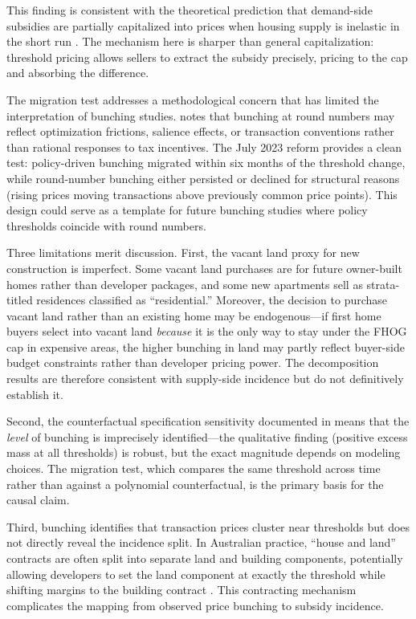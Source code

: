 \documentclass[12pt]{article}
\begin{document}
This finding is consistent with the theoretical prediction that demand-side subsidies are partially capitalized into prices when housing supply is inelastic in the short run \citep{susin2002rent, hilber2016impact}. The mechanism here is sharper than general capitalization: threshold pricing allows sellers to extract the subsidy precisely, pricing to the cap and absorbing the difference.

The migration test addresses a methodological concern that has limited the interpretation of bunching studies. \citet{kleven2016bunching} notes that bunching at round numbers may reflect optimization frictions, salience effects, or transaction conventions rather than rational responses to tax incentives. The July 2023 reform provides a clean test: policy-driven bunching migrated within six months of the threshold change, while round-number bunching either persisted or declined for structural reasons (rising prices moving transactions above previously common price points). This design could serve as a template for future bunching studies where policy thresholds coincide with round numbers.

Three limitations merit discussion. First, the vacant land proxy for new construction is imperfect. Some vacant land purchases are for future owner-built homes rather than developer packages, and some new apartments sell as strata-titled residences classified as ``residential.'' Moreover, the decision to purchase vacant land rather than an existing home may be endogenous---if first home buyers select into vacant land \textit{because} it is the only way to stay under the FHOG cap in expensive areas, the higher bunching in land may partly reflect buyer-side budget constraints rather than developer pricing power. The decomposition results are therefore consistent with supply-side incidence but do not definitively establish it.

Second, the counterfactual specification sensitivity documented in  means that the \textit{level} of bunching is imprecisely identified---the qualitative finding (positive excess mass at all thresholds) is robust, but the exact magnitude depends on modeling choices. The migration test, which compares the same threshold across time rather than against a polynomial counterfactual, is the primary basis for the causal claim.

Third, bunching identifies that transaction prices cluster near thresholds but does not directly reveal the incidence split. In Australian practice, ``house and land'' contracts are often split into separate land and building components, potentially allowing developers to set the land component at exactly the threshold while shifting margins to the building contract \citep{slemrod2013tax}. This contracting mechanism complicates the mapping from observed price bunching to subsidy incidence.
\end{document}

